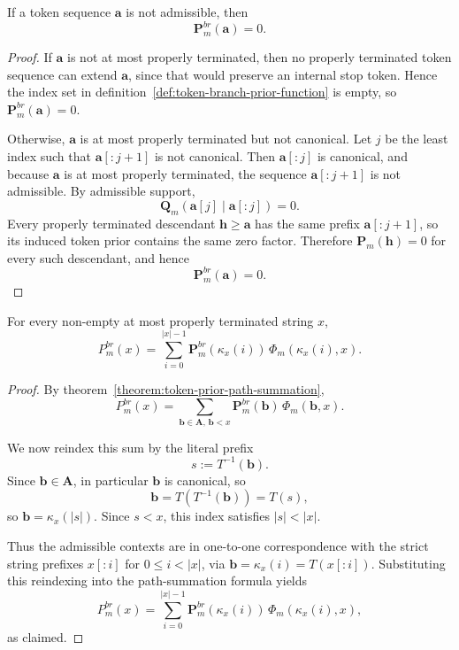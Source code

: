 \begin{lemma}
\label{lemma:nonadmissible-token-branch-prior-vanishes}
    If a token sequence $\mathbf{a}$ is not admissible, then
    \[
    \mathbf{P}^{br}_m(\mathbf{a}) = 0.
    \]
\end{lemma}
\begin{proof}
    If $\mathbf{a}$ is not at most properly terminated, then no properly terminated token
    sequence can extend $\mathbf{a}$, since that would preserve an internal stop token.
    Hence the index set in definition~\ref{def:token-branch-prior-function} is empty, so
    $\mathbf{P}^{br}_m(\mathbf{a}) = 0$.

    Otherwise, $\mathbf{a}$ is at most properly terminated but not canonical.
    Let $j$ be the least index such that $\mathbf{a}[:j+1]$ is not canonical.
    Then $\mathbf{a}[:j]$ is canonical, and because $\mathbf{a}$ is at most properly
    terminated, the sequence $\mathbf{a}[:j+1]$ is not admissible. By admissible support,
    \[
    \mathbf{Q}_m(\mathbf{a}[j] \mid \mathbf{a}[:j]) = 0.
    \]
    Every properly terminated descendant $\mathbf{h} \geq \mathbf{a}$ has the same prefix
    $\mathbf{a}[:j+1]$, so its induced token prior contains the same zero factor.
    Therefore $\mathbf{P}_m(\mathbf{h}) = 0$ for every such descendant, and hence
    \[
    \mathbf{P}^{br}_m(\mathbf{a}) = 0.
    \]
\end{proof}

\begin{theorem}
\label{theorem:string-ancestor-reindexing}
    For every non-empty at most properly terminated string $x$,
    \[
    P^{br}_m(x)
    =
    \sum_{i=0}^{|x|-1}
    \mathbf{P}^{br}_m(\kappa_x(i)) \, \Phi_m(\kappa_x(i), x).
    \]
\end{theorem}
\begin{proof}
    By theorem~\ref{theorem:token-prior-path-summation},
    \[
    P^{br}_m(x)
    =
    \sum_{\mathbf{b}\in\mathbf{A},\,\mathbf{b}<x}
    \mathbf{P}^{br}_m(\mathbf{b}) \, \Phi_m(\mathbf{b},x).
    \]

    We now reindex this sum by the literal prefix
    \[
    s := T^{-1}(\mathbf{b}).
    \]
    Since $\mathbf{b} \in \mathbf{A}$, in particular $\mathbf{b}$ is canonical, so
    \[
    \mathbf{b} = T(T^{-1}(\mathbf{b})) = T(s),
    \]
    so $\mathbf{b} = \kappa_x(|s|)$. Since $s < x$, this index satisfies
    $|s| < |x|$.

    Thus the admissible contexts are in one-to-one
    correspondence with the strict string prefixes $x[:i]$ for $0 \leq i < |x|$,
    via $\mathbf{b} = \kappa_x(i) = T(x[:i])$. Substituting this reindexing into
    the path-summation formula yields
    \[
    P^{br}_m(x)
    =
    \sum_{i=0}^{|x|-1}
    \mathbf{P}^{br}_m(\kappa_x(i)) \, \Phi_m(\kappa_x(i), x),
    \]
    as claimed.
\end{proof}


